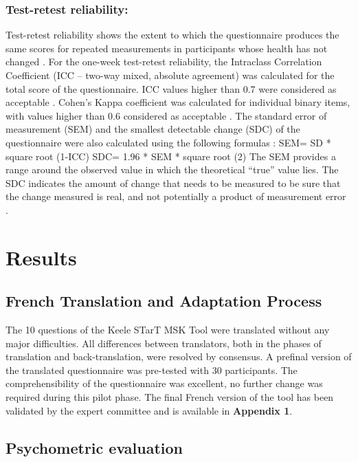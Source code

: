 \subsubsection{Test-retest reliability: }
Test-retest reliability shows the extent to which the questionnaire produces the same scores for repeated measurements in participants whose health has not changed \citep{mokkink2010cosmin}. For the one-week test-retest reliability, the Intraclass Correlation Coefficient (ICC – two-way mixed, absolute agreement) was calculated for the total score of the questionnaire. ICC values higher than 0.7 were considered as acceptable \citep{terwee2007quality}. Cohen’s Kappa coefficient was calculated for individual binary items, with values higher than 0.6 considered as acceptable \citep{mchugh2012interrater}. The standard error of measurement (SEM) and the smallest detectable change (SDC) of the questionnaire were also calculated using the following formulas \citep{de2011measurement}:
SEM= SD * square root (1-ICC)
SDC= 1.96 * SEM * square root (2)
The SEM provides a range around the observed value in which the theoretical “true” value lies. The SDC indicates the amount of change that needs to be measured to be sure that the change measured is real, and not potentially a product of measurement error \citep{mokkink2010cosmin}. 

\medbreak

\section{Results}
\subsection{French Translation and Adaptation Process}
The 10 questions of the Keele STarT MSK Tool were translated without any major difficulties. All differences between translators, both in the phases of translation and back-translation, were resolved by consensus. A prefinal version of the translated questionnaire was pre-tested with 30 participants. The comprehensibility of the questionnaire was excellent, no further change was required during this pilot phase. The final French version of the tool has been validated by the expert committee and is available in \textbf{Appendix 1}.

\subsection{Psychometric evaluation}
